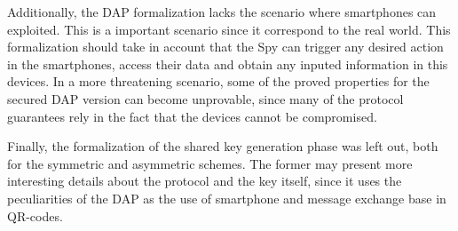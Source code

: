 Additionally, the DAP formalization lacks the scenario where smartphones can exploited. This is a important scenario since it correspond to the real world. This formalization should take in account that the Spy can trigger any desired action in the smartphones, access their data and obtain any inputed information in this devices. In a more threatening scenario, some of the proved properties for the secured DAP version can become unprovable, since many of the protocol guarantees rely in the fact that the devices cannot be compromised.

Finally, the formalization of the shared key generation phase was left out, both for the symmetric and asymmetric schemes. The former may present more interesting details about the protocol and the key itself, since it uses the peculiarities of the DAP as the use of smartphone and message exchange base in QR-codes.
